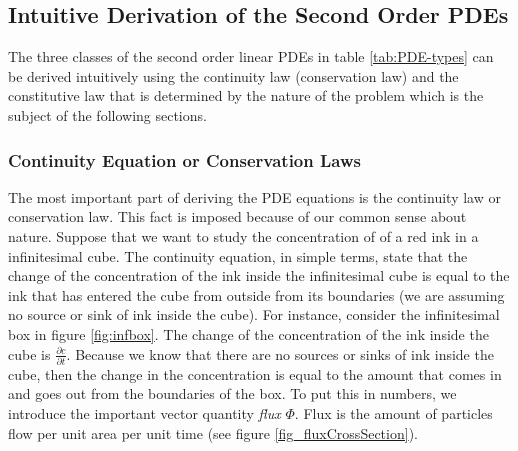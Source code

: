 \begin{table}[]
	\centering
	\caption{A summary of the three class of second order linear PDE.}
	\label{tab:PDE-types}
\end{table}


\subsection{Intuitive Derivation of the Second Order PDEs}
The three classes of the second order linear PDEs in table \ref{tab:PDE-types} can be derived intuitively using the continuity law (conservation law) and the constitutive law that is determined by the nature of the problem which is the subject of the following sections. 
 
\subsubsection{Continuity Equation or Conservation Laws}
The most important part of deriving the PDE equations is the continuity law or conservation law. This fact is imposed because of our common sense about nature. Suppose that we want to study the concentration of of a red ink in a infinitesimal cube. The continuity equation, in simple terms, state that the change of the concentration of the ink inside the infinitesimal cube is equal to the ink that has entered the cube from outside from its boundaries (we are assuming no source or sink of ink inside the cube). For instance, consider the infinitesimal box in figure \ref{fig:infbox}. The change of the concentration of the ink inside the cube is $\frac{\partial c}{\partial t}$. Because we know that there are no sources or sinks of ink inside the cube, then the change in the concentration is equal to the amount that comes in and goes out from the boundaries of the box. To put this in numbers, we introduce the important vector quantity \emph{flux} $ \Phi $. Flux is the amount of particles flow per unit area per unit time (see figure \ref{fig_fluxCrossSection}).

